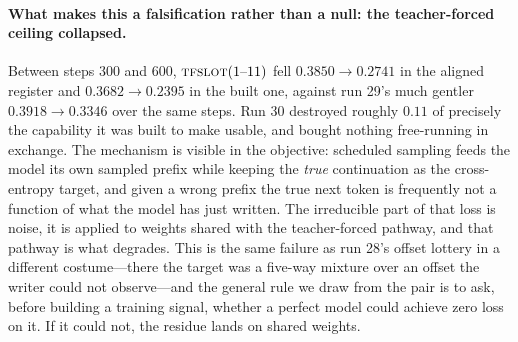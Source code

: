 \documentclass{article} %
\begin{document}
\paragraph{What makes this a falsification rather than a null: the teacher-forced ceiling collapsed.}
Between steps $300$ and $600$, $\textsc{tfslot}(1\text{--}11)$ fell $0.3850 \to 0.2741$ in the aligned
register and $0.3682 \to 0.2395$ in the built one, against run 29's much gentler $0.3918 \to 0.3346$
over the same steps. Run 30 destroyed roughly $0.11$ of precisely the capability it was built to make
usable, and bought nothing free-running in exchange. The mechanism is visible in the objective:
scheduled sampling feeds the model its own sampled prefix while keeping the \emph{true} continuation
as the cross-entropy target, and given a wrong prefix the true next token is frequently not a
function of what the model has just written. The irreducible part of that loss is noise, it is
applied to weights shared with the teacher-forced pathway, and that pathway is what degrades. This
is the same failure as run 28's offset lottery in a different costume---there the target was a
five-way mixture over an offset the writer could not observe---and the general rule we draw from the
pair is to ask, before building a training signal, whether a perfect model could achieve zero loss
on it. If it could not, the residue lands on shared weights.
\end{document}
